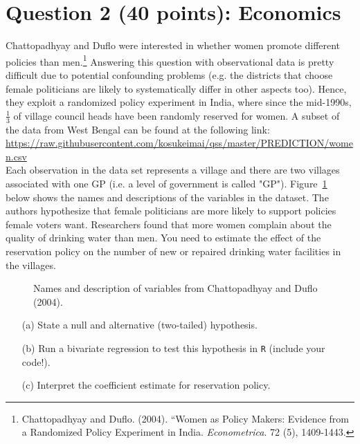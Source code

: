 \documentclass[12pt,letterpaper]{article}
\begin{document}
\section*{Question 2 (40 points): Economics}
Chattopadhyay and Duflo were interested in whether women promote different policies than men.\footnote{Chattopadhyay and Duflo. (2004). ``Women as Policy Makers: Evidence from a Randomized Policy Experiment in India. \textit{Econometrica}. 72 (5), 1409-1443.} Answering this question with observational data is pretty difficult due to potential confounding problems (e.g. the districts that choose female politicians are likely to systematically differ in other aspects too). Hence, they exploit a randomized policy experiment in India, where since the mid-1990s, $\frac{1}{3}$ of village council heads have been randomly reserved for women. A subset of the data from West Bengal can be found at the following link: \url{https://raw.githubusercontent.com/kosukeimai/qss/master/PREDICTION/women.csv}\\
\noindent Each observation in the data set represents a village and there are two villages associated with one GP (i.e. a level of government is called "GP"). Figure~\ref{fig:women_desc} below shows the names and descriptions of the variables in the dataset. The authors hypothesize that female politicians are more likely to support policies female voters want. Researchers found that more women complain about the quality of drinking water than men. You need to estimate the effect of the reservation policy on the number of new or repaired drinking water facilities in the villages.
\vspace{.5cm}
\begin{figure}[h!]
	\caption{\footnotesize{Names and description of variables from Chattopadhyay and Duflo (2004).}}
	\vspace{.5cm}
	\centering
	\label{fig:women_desc}
\end{figure}		
\newpage
\begin{enumerate}
	\item [(a)] State a null and alternative (two-tailed) hypothesis. 

	\vspace{6cm}
	\item [(b)] Run a bivariate regression to test this hypothesis in \texttt{R} (include your code!).
	
	\vspace{6cm}
	\item [(c)] Interpret the coefficient estimate for reservation policy. 
\end{enumerate}
\newpage
	
\end{document}
